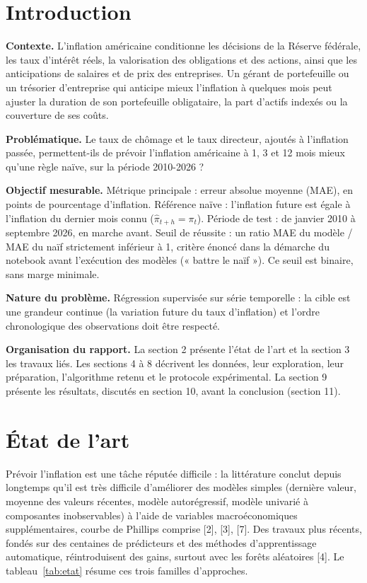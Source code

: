 \documentclass[11pt,a4paper]{article}
\begin{document}
\section{Introduction}
\textbf{Contexte.} L'inflation américaine conditionne les décisions de la Réserve fédérale, les taux d'intérêt réels, la valorisation des obligations et des actions, ainsi que les anticipations de salaires et de prix des entreprises. Un gérant de portefeuille ou un trésorier d'entreprise qui anticipe mieux l'inflation à quelques mois peut ajuster la duration de son portefeuille obligataire, la part d'actifs indexés ou la couverture de ses coûts.

\textbf{Problématique.} Le taux de chômage et le taux directeur, ajoutés à l'inflation passée, permettent-ils de prévoir l'inflation américaine à 1, 3 et 12 mois mieux qu'une règle naïve, sur la période 2010-2026 ?

\textbf{Objectif mesurable.} Métrique principale : erreur absolue moyenne (MAE), en points de pourcentage d'inflation. Référence naïve : l'inflation future est égale à l'inflation du dernier mois connu ($\hat\pi_{t+h}=\pi_t$). Période de test : de janvier 2010 à septembre 2026, en marche avant. Seuil de réussite : un ratio MAE du modèle / MAE du naïf strictement inférieur à 1, critère énoncé dans la démarche du notebook avant l'exécution des modèles (« battre le naïf »). Ce seuil est binaire, sans marge minimale.

\textbf{Nature du problème.} Régression supervisée sur série temporelle : la cible est une grandeur continue (la variation future du taux d'inflation) et l'ordre chronologique des observations doit être respecté.

\textbf{Organisation du rapport.} La section 2 présente l'état de l'art et la section 3 les travaux liés. Les sections 4 à 8 décrivent les données, leur exploration, leur préparation, l'algorithme retenu et le protocole expérimental. La section 9 présente les résultats, discutés en section 10, avant la conclusion (section 11).

\section{État de l'art}
Prévoir l'inflation est une tâche réputée difficile : la littérature conclut depuis longtemps qu'il est très difficile d'améliorer des modèles simples (dernière valeur, moyenne des valeurs récentes, modèle autorégressif, modèle univarié à composantes inobservables) à l'aide de variables macroéconomiques supplémentaires, courbe de Phillips comprise [2], [3], [7]. Des travaux plus récents, fondés sur des centaines de prédicteurs et des méthodes d'apprentissage automatique, réintroduisent des gains, surtout avec les forêts aléatoires [4]. Le tableau~\ref{tab:etat} résume ces trois familles d'approches.
\end{document}
